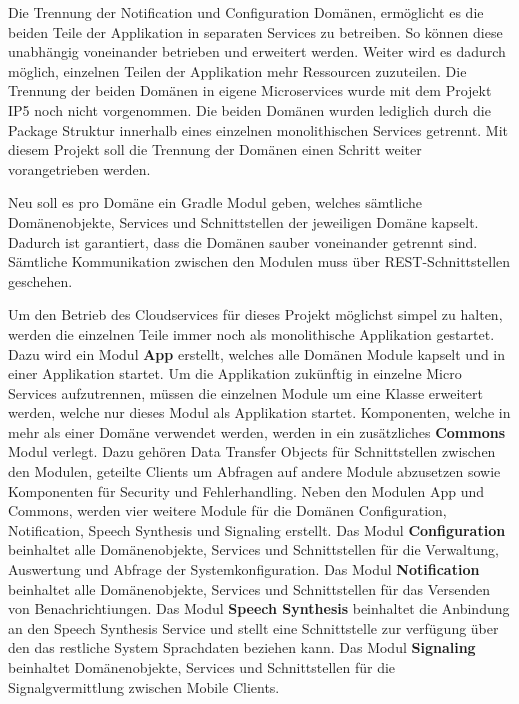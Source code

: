 Die Trennung der Notification und Configuration Domänen, ermöglicht es die beiden Teile der Applikation in separaten Services zu betreiben.
So können diese unabhängig voneinander betrieben und erweitert werden.
Weiter wird es dadurch möglich, einzelnen Teilen der Applikation mehr Ressourcen zuzuteilen.
Die Trennung der beiden Domänen in eigene Microservices wurde mit dem Projekt IP5 noch nicht vorgenommen.
Die beiden Domänen wurden lediglich durch die Package Struktur innerhalb eines einzelnen monolithischen Services getrennt.
Mit diesem Projekt soll die Trennung der Domänen einen Schritt weiter vorangetrieben werden.

Neu soll es pro Domäne ein Gradle Modul geben, welches sämtliche Domänenobjekte, Services und Schnittstellen der jeweiligen Domäne kapselt.
Dadurch ist garantiert, dass die Domänen sauber voneinander getrennt sind.
Sämtliche Kommunikation zwischen den Modulen muss über REST-Schnittstellen geschehen.

Um den Betrieb des Cloudservices für dieses Projekt möglichst simpel zu halten, werden die einzelnen Teile immer noch als monolithische Applikation gestartet.
Dazu wird ein Modul \textbf{App} erstellt, welches alle Domänen Module kapselt und in einer Applikation startet.
Um die Applikation zukünftig in einzelne Micro Services aufzutrennen, müssen die einzelnen Module um eine Klasse erweitert werden, welche nur dieses Modul als Applikation startet.
Komponenten, welche in mehr als einer Domäne verwendet werden, werden in ein zusätzliches \textbf{Commons} Modul verlegt.
Dazu gehören Data Transfer Objects für Schnittstellen zwischen den Modulen, geteilte Clients um Abfragen auf andere Module abzusetzen sowie Komponenten für Security und Fehlerhandling.
Neben den Modulen App und Commons, werden vier weitere Module für die Domänen Configuration, Notification, Speech Synthesis und Signaling erstellt.
Das Modul \textbf{Configuration} beinhaltet alle Domänenobjekte, Services und Schnittstellen für die Verwaltung, Auswertung und Abfrage der Systemkonfiguration.
Das Modul \textbf{Notification} beinhaltet alle Domänenobjekte, Services und Schnittstellen für das Versenden von Benachrichtiungen.
Das Modul \textbf{Speech Synthesis} beinhaltet die Anbindung an den Speech Synthesis Service und stellt eine Schnittstelle zur verfügung über den das restliche System Sprachdaten beziehen kann.
Das Modul \textbf{Signaling} beinhaltet Domänenobjekte, Services und Schnittstellen für die Signalgvermittlung zwischen Mobile Clients.

\clearpage

